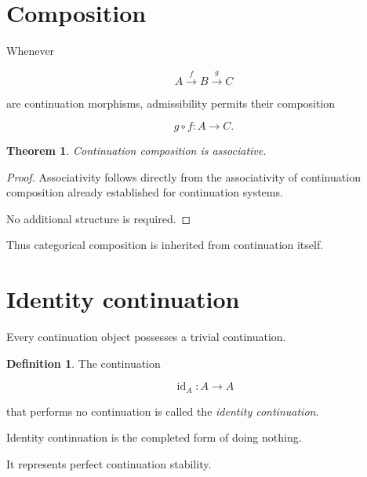 \documentclass[13pt,openany]{book}
\theoremstyle{plain}
\newtheorem{theorem}{Theorem}[chapter]
\theoremstyle{definition}
\newtheorem{definition}{Definition}[chapter]
\begin{document}
\section{Composition}

Whenever

\[
A
\xrightarrow{f}
B
\xrightarrow{g}
C
\]

are continuation morphisms, admissibility permits their composition

\[
g\circ f
:
A
\rightarrow
C.
\]

\begin{theorem}

Continuation composition is associative.

\end{theorem}

\begin{proof}

Associativity follows directly from the associativity of continuation
composition already established for continuation systems.

No additional structure is required.

\end{proof}

Thus categorical composition is inherited from continuation itself.

\section{Identity continuation}

Every continuation object possesses a trivial continuation.

\begin{definition}

The continuation

\[
\operatorname{id}_A:A\rightarrow A
\]

that performs no continuation is called the
\emph{identity continuation}.

\end{definition}

Identity continuation is the completed form of doing nothing.

It represents perfect continuation stability.
\end{document}
